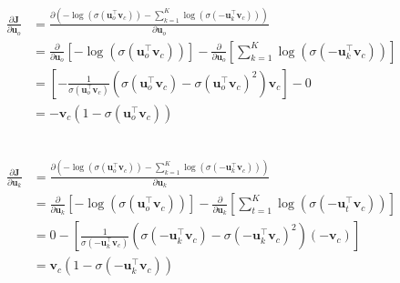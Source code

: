 \documentclass{article}
\begin{document}
~\\

\begin{equation*}
  \begin{aligned}
    \frac{\partial \boldsymbol{J}}{\partial \boldsymbol{u}_o} &= \frac{\partial (-\log \left(\sigma\left(\boldsymbol{u}_{o}^{\top} \boldsymbol{v}_{c}\right)\right)-\sum_{k=1}^{K} \log \left(\sigma\left(-\boldsymbol{u}_{k}^{\top} \boldsymbol{v}_{c}\right)\right))}{\partial \boldsymbol{u}_o} \\ 
    & = \frac{\partial}{\partial \boldsymbol{u}_o} \left[- \log (\sigma(\boldsymbol{u}_{o}^{\top} \boldsymbol{v}_{c}))\right] - \frac{\partial}{\partial \boldsymbol{u}_o}\left[\sum_{k=1}^{K} \log (\sigma(-\boldsymbol{u}_{k}^{\top} \boldsymbol{v}_{c}))\right] \\
    & = \left[- \frac{1}{\sigma(\boldsymbol{u}_{o}^{\top} \boldsymbol{v}_{c})} \left(\sigma(\boldsymbol{u}_{o}^{\top} \boldsymbol{v}_{c}) - \sigma(\boldsymbol{u}_{o}^{\top} \boldsymbol{v}_{c})^2\right) \boldsymbol{v}_{c}\right] - 0 \\ 
    & = - \boldsymbol{v}_{c} \left(1-\sigma(\boldsymbol{u}_{o}^{\top} \boldsymbol{v}_{c})\right) 
  \end{aligned}
\end{equation*}

~\\

\begin{equation*}
  \begin{aligned}
    \frac{\partial \boldsymbol{J}}{\partial \boldsymbol{u}_k} &= \frac{\partial (-\log \left(\sigma\left(\boldsymbol{u}_{o}^{\top} \boldsymbol{v}_{c}\right)\right)-\sum_{k=1}^{K} \log \left(\sigma\left(-\boldsymbol{u}_{k}^{\top} \boldsymbol{v}_{c}\right)\right))}{\partial \boldsymbol{u}_k} \\ 
    & = \frac{\partial}{\partial \boldsymbol{u}_k} \left[- \log (\sigma(\boldsymbol{u}_{o}^{\top} \boldsymbol{v}_{c}))\right] - \frac{\partial}{\partial \boldsymbol{u}_k}\left[\sum_{t=1}^{K} \log (\sigma(-\boldsymbol{u}_{t}^{\top} \boldsymbol{v}_{c}))\right] \\
    & = 0 - \left[\frac{1}{\sigma(-\boldsymbol{u}_{k}^{\top} \boldsymbol{v}_{c})} \left(\sigma(-\boldsymbol{u}_{k}^{\top} \boldsymbol{v}_{c}) - \sigma(-\boldsymbol{u}_{k}^{\top} \boldsymbol{v}_{c})^2\right)(-\boldsymbol{v}_{c})\right] \\ 
    & = \boldsymbol{v}_{c}\left(1-\sigma(-\boldsymbol{u}_{k}^{\top} \boldsymbol{v}_{c})\right)
  \end{aligned}
\end{equation*}
\end{document}
